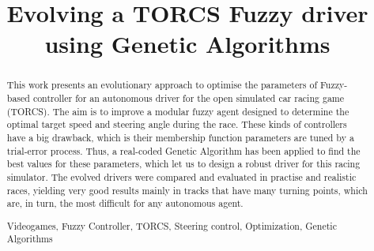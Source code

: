 \documentclass[runningheads,a4paper]{llncs}
\newcommand{\keywords}[1]{\par\addvspace\baselineskip
	\noindent\keywordname\enspace\ignorespaces#1}
\begin{document}
	
	\mainmatter  %
	
	\title{Evolving a TORCS Fuzzy driver using Genetic Algorithms}
	
	
	
	
	
	
	
	
	

	
	\maketitle
	\begin{abstract}
		
		This work presents an evolutionary approach to optimise the parameters of Fuzzy-based controller for an autonomous driver for the open simulated car racing game (TORCS). The aim is to improve a modular fuzzy agent designed to determine the optimal target speed and steering angle during the race.
These kinds of controllers have a big drawback, which is their membership function parameters are tuned by a trial-error process.
Thus, a real-coded Genetic Algorithm 
has been applied to find the best values for these parameters, which let us to design a robust driver for this racing simulator.
The evolved drivers were compared and  evaluated in practise and realistic races, yielding very good results mainly in tracks that have many turning points, which are, in turn, the most difficult for any autonomous agent.
	\keywords{Videogames, Fuzzy Controller, TORCS, Steering control, Optimization, Genetic Algorithms}
	\end{abstract}
\end{document}
